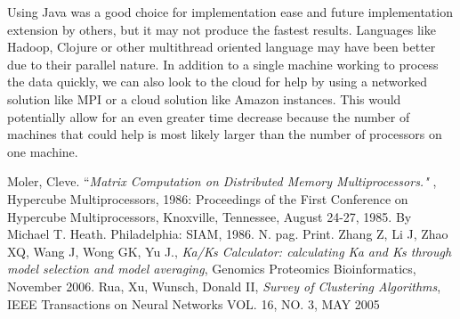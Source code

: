 \documentclass[12pt]{article}
\begin{document}
Using Java was a good choice for implementation ease and future implementation
extension by others, but it may not produce the fastest results. Languages
like Hadoop, Clojure or other multithread oriented language may have been better
due to their parallel nature. In addition to a single machine working to process
the data quickly, we can also look to the cloud for help by using a networked 
solution like MPI or a cloud solution like Amazon instances. This would
potentially allow for an even greater time decrease because the number of
machines that could help is most likely larger than the number of processors on
one machine.

\begin{thebibliography}{1}
Moler, Cleve. ``\emph{Matrix Computation on Distributed Memory Multiprocessors."
}, Hypercube Multiprocessors, 1986: Proceedings of the First Conference on
Hypercube Multiprocessors, Knoxville, Tennessee, August 24-27, 1985. By Michael
T. Heath. Philadelphia: SIAM, 1986. N. pag. Print.
Zhang Z, Li J, Zhao XQ, Wang J, Wong GK, Yu J., \emph{Ka/Ks Calculator: 
calculating Ka and Ks through model selection and model averaging},
Genomics Proteomics Bioinformatics, November 2006.
Rua, Xu, Wunsch, Donald II, \emph{Survey of Clustering Algorithms},
IEEE Transactions on Neural Networks VOL. 16, NO. 3, MAY 2005
\end{thebibliography}
\end{document}
